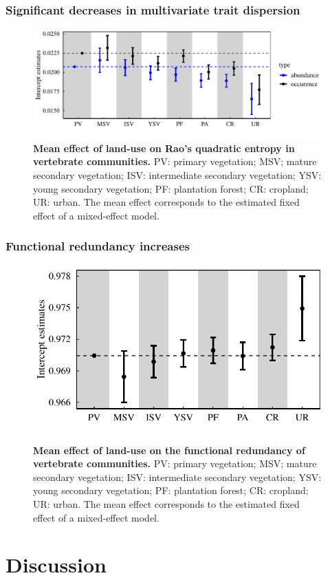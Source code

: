 \subsubsection{Significant decreases in multivariate trait dispersion}
\begin{figure}[h!]
\centering
\includegraphics[scale=0.70]{figures/chapter3/RaoQ/Mean_effect_FRaoQ}
\caption[Mean effect of land-use on Rao's quadratic entropy in vertebrate communities]{\textbf{Mean effect of land-use on Rao's quadratic entropy in vertebrate communities.} PV: primary vegetation; MSV; mature secondary vegetation; ISV: intermediate secondary vegetation; YSV: young secondary vegetation; PF: plantation forest; CR: cropland; UR: urban. The mean effect corresponds to the estimated fixed effect of a mixed-effect model.}
\label{LU_mean_FRic}
\end{figure}


\subsubsection{Functional redundancy increases}
\begin{figure}[h!]
\centering
\includegraphics[scale=0.70]{figures/chapter3/FRedundancy/Mean_effect_LU}
\caption[Mean effect of land-use on the functional redundancy of vertebrate communities]{\textbf{Mean effect of land-use on the functional redundancy of vertebrate communities.} PV: primary vegetation; MSV; mature secondary vegetation; ISV: intermediate secondary vegetation; YSV: young secondary vegetation; PF: plantation forest; CR: cropland; UR: urban. The mean effect corresponds to the estimated fixed effect of a mixed-effect model.}
\label{LU_mean_FRic}
\end{figure}



\section{Discussion}
